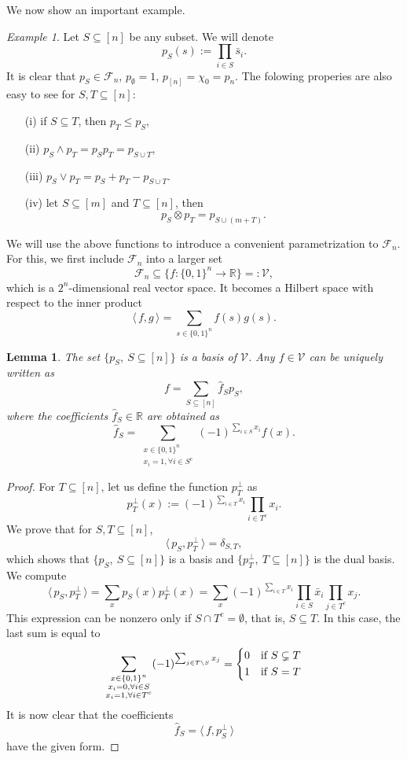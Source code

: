 \documentclass[12pt]{article}
\newtheorem{lemma}{Lemma}
\theoremstyle{definition}
\theoremstyle{remark}
\newtheorem{example}{Example}
\def\Fe{\mathcal F}
\def\<{\langle\,}
\def\>{\,\rangle}
\begin{document}
We now show an important example. 


\begin{example}\label{ex:ps} Let $S\subseteq [n]$ be any subset. We will denote
\[
p_S(s):=\prod_{i\in S}\bar s_i.
\]
It is clear that $p_S\in \Fe_n$, $p_{\emptyset}=1$, $p_{[n]}=\chi_0=p_n$. The folowing
properies are also easy
to see for $S,T\subseteq [n]$:
\begin{enumerate}
\item[(i)] if $S\subseteq T$, then $p_T\le p_S$,
\item[(ii)]  $p_S\wedge p_T=p_Sp_T=p_{S\cup T}$,
\item[(iii)]  $p_S\vee p_T=p_S+p_T-p_{S\cup T}$.
\item[(iv)] let $S\subseteq [m]$ and $T\subseteq [n]$, then 
\[
p_S\otimes p_T=p_{S\cup (m+T)}.
\]
\end{enumerate}


\end{example}




We will use the above functions to introduce  a convenient  parametrization to $\Fe_n$.  
For this, we first include $\Fe_n$ into a larger set
\[
\Fe_n\subseteq \{f:\{0,1\}^n\to \mathbb R\}=:\mathcal V,
\]
which is a $2^n$-dimensional real vector space. It becomes a Hilbert space with respect to
the inner product
\[
\<f,g\>=\sum_{s\in \{0,1\}^n} f(s)g(s). 
\]

\begin{lemma}\label{lemma:Vbasis} The set $\{p_S,\ S\subseteq [n]\}$ is a basis of
$\mathcal V$.
Any $f\in \mathcal V$ can be uniquely written as
\[
f=\sum_{S\subseteq [n]} \hat f_Sp_S,
\]
where the coefficients $\hat f_S\in \mathbb R$ are obtained as
\[
\hat f_S=\sum_{\substack{x\in \{0,1\}^n\\ x_i=1, \forall  i\in S^c}} (-1)^{\sum_{i\in
S}x_i}f(x).
\]
\end{lemma}



\begin{proof} For $T\subseteq [n]$, let us define the function $p_T^\perp$ as
\[
p_T^\perp(x):= (-1)^{\sum_{i\in T}x_i}\prod_{i\in T^c}x_i. 
\]
We prove that for $S,T\subseteq [n]$,
\[
\<p_S,p^\perp_T\>=\delta_{S,T},
\]
which shows that $\{p_S,\ S\subseteq [n]\}$ is a basis and 
$\{p_T^\perp, \ T\subseteq [n]\}$  is the dual basis. We compute
\[
\<p_S,p^\perp_T\>=\sum_x p_S(x)p^\perp_T(x)=\sum_x (-1)^{\sum_{i\in T} x_i}\prod_{i\in S}
\bar x_i\prod_{j\in T^c}x_j.
\]
This expression can be nonzero only if $S\cap T^c=\emptyset$, that is, $S\subseteq T$. In
this case, the last sum  is equal to
\[
\sum_{\substack{x\in \{0,1\}^n\\ x_i=0,\forall i\in S\\x_i=1,\forall i\in T^c}}
(-1)^{\sum_{j\in T\setminus S}x_j}=\begin{dcases} 0 & \text{if } S\subsetneq T\\
  1 &\text{if } S=T
  \end{dcases}
\]
It is now clear that the coefficients
\[
\hat f_S=\<f,p^\perp_S\>
\]
have the given form.


\end{proof}
\end{document}
